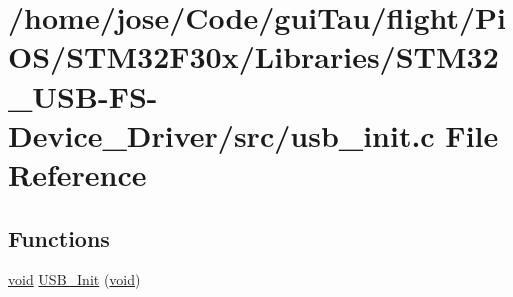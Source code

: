 \hypertarget{_s_t_m32_f30x_2_libraries_2_s_t_m32___u_s_b-_f_s-_device___driver_2src_2usb__init_8c}{\section{/home/jose/\-Code/gui\-Tau/flight/\-Pi\-O\-S/\-S\-T\-M32\-F30x/\-Libraries/\-S\-T\-M32\-\_\-\-U\-S\-B-\/\-F\-S-\/\-Device\-\_\-\-Driver/src/usb\-\_\-init.c File Reference}
\label{_s_t_m32_f30x_2_libraries_2_s_t_m32___u_s_b-_f_s-_device___driver_2src_2usb__init_8c}
}
\subsection*{Functions}
\begin{DoxyCompactItemize}
\item 
\hyperlink{group___n_a_m_e_ga18028b8badbf1ea7e704ccac3c488e82}{void} \hyperlink{_s_t_m32_f30x_2_libraries_2_s_t_m32___u_s_b-_f_s-_device___driver_2src_2usb__init_8c_a35fe971cbcbfe8813199e869284cb862}{U\-S\-B\-\_\-\-Init} (\hyperlink{group___n_a_m_e_ga18028b8badbf1ea7e704ccac3c488e82}{void})
\end{DoxyCompactItemize}
